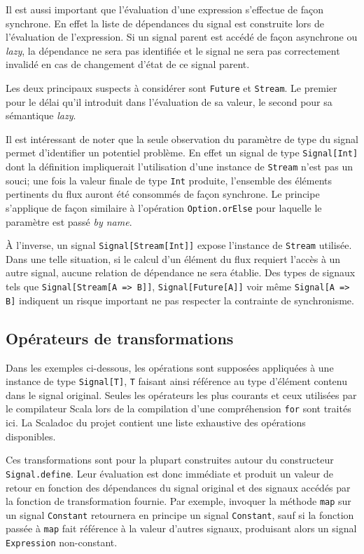 Il est aussi important que l'évaluation d'une expression s'effectue de façon synchrone. En effet la liste de dépendances du signal est construite lors de l'évaluation de l'expression. Si un signal parent est accédé de façon asynchrone ou \emph{lazy}, la dépendance ne sera pas identifiée et le signal ne sera pas correctement invalidé en cas de changement d'état de ce signal parent.

Les deux principaux suspects à considérer sont \texttt{Future} et \texttt{Stream}. Le premier pour le délai qu'il introduit dans l'évaluation de sa valeur, le second pour sa sémantique \emph{lazy}.

Il est intéressant de noter que la seule observation du paramètre de type du signal permet d'identifier un potentiel problème. En effet un signal de type \texttt{Signal[Int]} dont la définition impliquerait l'utilisation d'une instance de \texttt{Stream} n'est pas un souci; une fois la valeur finale de type \texttt{Int} produite, l'ensemble des éléments pertinents du flux auront été consommés de façon synchrone. Le principe s'applique de façon similaire à l'opération \texttt{Option.orElse} pour laquelle le paramètre est passé \emph{by name}.

À l'inverse, un signal \texttt{Signal[Stream[Int]]} expose l'instance de \texttt{Stream} utilisée. Dans une telle situation, si le calcul d'un élément du flux requiert l'accès à un autre signal, aucune relation de dépendance ne sera établie. Des types de signaux tels que \texttt{Signal[Stream[A => B]]}, \texttt{Signal[Future[A]]} voir même \texttt{Signal[A => B]} indiquent un risque important ne pas respecter la contrainte de synchronisme.

\subsection{Opérateurs de transformations}
Dans les exemples ci-dessous, les opérations sont supposées appliquées à une instance de type \texttt{Signal[T]}, \texttt{T} faisant ainsi référence au type d'élément contenu dans le signal original. Seules les opérateurs les plus courants et ceux utilisées par le compilateur Scala lors de la compilation d'une compréhension \texttt{for} sont traités ici. La Scaladoc du projet contient une liste exhaustive des opérations disponibles.

Ces transformations sont pour la plupart construites autour du constructeur \texttt{Signal.define}. Leur évaluation est donc immédiate et produit un valeur de retour en fonction des dépendances du signal original et des signaux accédés par la fonction de transformation fournie. Par exemple, invoquer la méthode \texttt{map} sur un signal \texttt{Constant} retournera en principe un signal \texttt{Constant}, sauf si la fonction passée à \texttt{map} fait référence à la valeur d'autres signaux, produisant alors un signal \texttt{Expression} non-constant.

